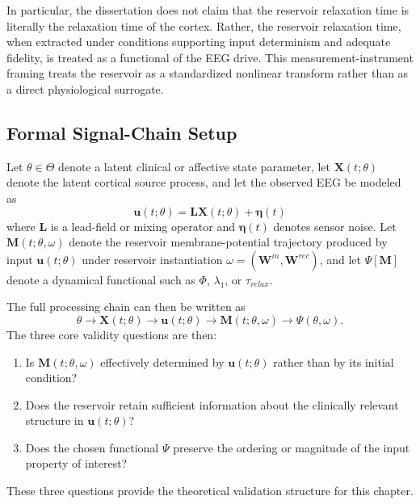 In particular, the dissertation does not claim that the reservoir relaxation time is literally the relaxation time of the cortex. Rather, the reservoir relaxation time, when extracted under conditions supporting input determinism and adequate fidelity, is treated as a functional of the EEG drive. This measurement-instrument framing treats the reservoir as a standardized nonlinear transform rather than as a direct physiological surrogate.

\subsection{Formal Signal-Chain Setup}

Let $\theta \in \Theta$ denote a latent clinical or affective state parameter, let $\mathbf{X}(t;\theta)$ denote the latent cortical source process, and let the observed EEG be modeled as
\begin{equation}
\mathbf{u}(t;\theta)=\mathbf{L}\mathbf{X}(t;\theta)+\boldsymbol{\eta}(t)
\end{equation}
where $\mathbf{L}$ is a lead-field or mixing operator and $\boldsymbol{\eta}(t)$ denotes sensor noise. Let $\mathbf{M}(t;\theta,\omega)$ denote the reservoir membrane-potential trajectory produced by input $\mathbf{u}(t;\theta)$ under reservoir instantiation $\omega=(\mathbf{W}^{in},\mathbf{W}^{rec})$, and let $\Psi[\mathbf{M}]$ denote a dynamical functional such as $\Phi$, $\lambda_1$, or $\tau_{relax}$.

The full processing chain can then be written as
\begin{equation}
\theta \rightarrow \mathbf{X}(t;\theta) \rightarrow \mathbf{u}(t;\theta) \rightarrow \mathbf{M}(t;\theta,\omega) \rightarrow \Psi(\theta,\omega).
\end{equation}
The three core validity questions are then:
\begin{enumerate}
    \item Is $\mathbf{M}(t;\theta,\omega)$ effectively determined by $\mathbf{u}(t;\theta)$ rather than by its initial condition?
    \item Does the reservoir retain sufficient information about the clinically relevant structure in $\mathbf{u}(t;\theta)$?
    \item Does the chosen functional $\Psi$ preserve the ordering or magnitude of the input property of interest?
\end{enumerate}
These three questions provide the theoretical validation structure for this chapter.

